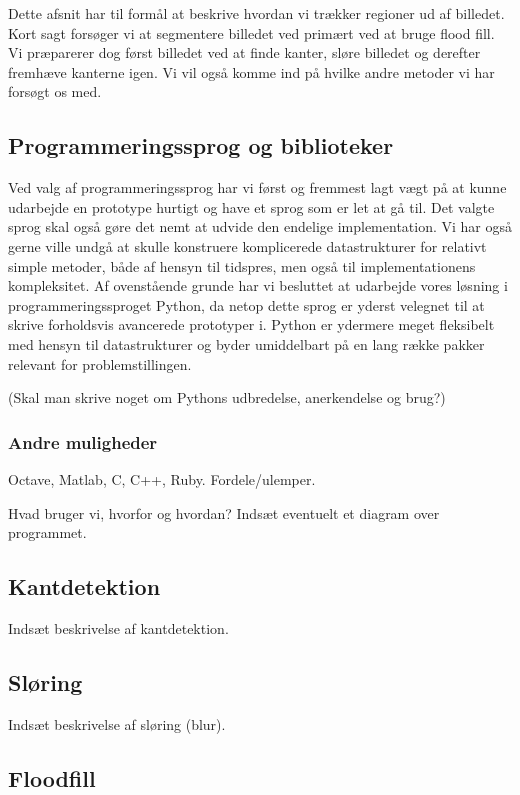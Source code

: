 {
{\sffamily Dette afsnit har til formål at beskrive hvordan vi trækker
regioner ud af billedet. Kort sagt forsøger vi at segmentere billedet
ved primært ved at bruge flood fill. Vi præparerer dog først billedet
ved at finde kanter, sløre billedet og derefter fremhæve kanterne igen.
Vi vil også komme ind på hvilke andre metoder vi har forsøgt os med.
}

\subsection{Programmeringssprog og biblioteker}
Ved valg af programmeringssprog har vi først og fremmest lagt vægt på at
kunne udarbejde en prototype hurtigt og have et sprog som er let at gå
til. Det valgte sprog skal også gøre det nemt at udvide den endelige
implementation. Vi har også gerne ville undgå at skulle konstruere
komplicerede datastrukturer for relativt simple metoder, både af hensyn
til tidspres, men også til implementationens kompleksitet. Af
ovenstående grunde har vi besluttet at udarbejde vores løsning i
programmeringssproget Python, da netop dette sprog er yderst velegnet
til at skrive forholdsvis avancerede prototyper i. Python er
ydermere meget fleksibelt med hensyn til datastrukturer og byder
umiddelbart på en lang række pakker relevant for problemstillingen.

(Skal man skrive noget om Pythons udbredelse, anerkendelse og brug?)

\subsubsection{Andre muligheder}
Octave, Matlab, C, C++, Ruby. Fordele/ulemper.

Hvad bruger vi, hvorfor og hvordan? Indsæt eventuelt et diagram over
programmet.

\subsection{Kantdetektion}
Indsæt beskrivelse af kantdetektion.

\subsection{Sløring}
Indsæt beskrivelse af sløring (blur).

\subsection{Floodfill}


}

